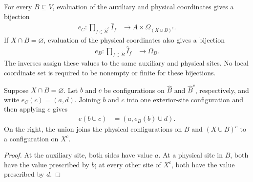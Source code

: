 \begin{definition}
\label{def:compressed_site_region_coordinates}
\leanok
{}
For every $B\subseteq V$, evaluation of the auxiliary and physical
coordinates gives a bijection
\begin{align}
 e_C:\prod_{f\in\widehat B^c}\widehat I_f
   &\longrightarrow A\times\Omega_{(X\cup B)^c}.
\end{align}
If $X\cap B=\varnothing$, evaluation of the physical coordinates also
gives a bijection
\begin{align}
 e_B:\prod_{f\in\widehat B}\widehat I_f
   &\longrightarrow\Omega_B.
\end{align}
The inverses assign these values to the same auxiliary and physical sites.
No local coordinate set is required to be nonempty or finite for these
bijections.
\end{definition}

\begin{theorem}
\label{thm:compressed_site_region_split}
\leanok
{}
Suppose $X\cap B=\varnothing$. Let $b$ and $c$ be configurations on
$\widehat B$ and $\widehat B^c$, respectively, and write $e_C(c)=(a,d)$.
Joining $b$ and $c$ into one exterior-site configuration and then applying
$e$ gives
\begin{align}
 e(b\cup c)&=(a,e_B(b)\cup d).
\end{align}
On the right, the union joins the physical configurations on $B$ and
$(X\cup B)^c$ to a configuration on $X^c$.
\end{theorem}
\begin{proof}
\leanok
At the auxiliary site, both sides have value $a$. At a physical site in
$B$, both have the value prescribed by $b$; at every other site of $X^c$,
both have the value prescribed by $d$.
\end{proof}

